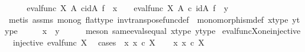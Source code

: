 \begin{isabellebody}
\ \ \isamarkupfalse%
\ \isamarkupfalse%
\ {\isachardoublequoteopen}eval{\isacharunderscore}{\kern0pt}func\ X\ A\ {\isasymcirc}\isactrlsub c{\isacharparenleft}{\kern0pt}id{\isacharparenleft}{\kern0pt}A{\isacharparenright}{\kern0pt}\ {\isasymtimes}\isactrlsub f\ \ x{\isacharparenright}{\kern0pt}\ {\isacharequal}{\kern0pt}\ \ \ eval{\isacharunderscore}{\kern0pt}func\ X\ A\ {\isasymcirc}\isactrlsub c\ {\isacharparenleft}{\kern0pt}id{\isacharparenleft}{\kern0pt}A{\isacharparenright}{\kern0pt}\ {\isasymtimes}\isactrlsub f\ \ y{\isacharparenright}{\kern0pt}{\isachardoublequoteclose}\ \ \isanewline
\ \ \ \ \isamarkupfalse%
\ {\isacharparenleft}{\kern0pt}metis\ assms{\isacharparenleft}{\kern0pt}{}{\isacharparenright}{\kern0pt}\ mono{\isacharunderscore}{\kern0pt}g\ flat{\isacharunderscore}{\kern0pt}type\ inv{\isacharunderscore}{\kern0pt}transpose{\isacharunderscore}{\kern0pt}func{\isacharunderscore}{\kern0pt}def{}\ \ monomorphism{\isacharunderscore}{\kern0pt}def{}\ x{\isacharunderscore}{\kern0pt}type{\isacharprime}{\kern0pt}\ y{\isacharunderscore}{\kern0pt}type{\isacharprime}{\kern0pt}{\isacharparenright}{\kern0pt}\isanewline
\ \ \isamarkupfalse%
\ \isamarkupfalse%
\ {\isachardoublequoteopen}x\ {\isacharequal}{\kern0pt}\ y{\isachardoublequoteclose}\isanewline
\ \ \ \ \isamarkupfalse%
\ {\isacharparenleft}{\kern0pt}meson\ same{\isacharunderscore}{\kern0pt}evals{\isacharunderscore}{\kern0pt}equal\ x{\isacharunderscore}{\kern0pt}type{\isacharprime}{\kern0pt}\ y{\isacharunderscore}{\kern0pt}type{\isacharprime}{\kern0pt}{\isacharparenright}{\kern0pt}\isanewline
{}\isamarkupfalse%
%
\endisatagproof
{\isafoldproof}%
%
\isadelimproof
\isanewline
%
\endisadelimproof
\isanewline
{}\isamarkupfalse%
\ eval{\isacharunderscore}{\kern0pt}func{\isacharunderscore}{\kern0pt}X{\isacharunderscore}{\kern0pt}one{\isacharunderscore}{\kern0pt}injective{\isacharcolon}{\kern0pt}\isanewline
\ \ {\isachardoublequoteopen}injective\ {\isacharparenleft}{\kern0pt}eval{\isacharunderscore}{\kern0pt}func\ X\ {\isasymone}{\isacharparenright}{\kern0pt}{\isachardoublequoteclose}\isanewline
%
\isadelimproof
%
\endisadelimproof
%
\isatagproof
{}\isamarkupfalse%
\ {\isacharparenleft}{\kern0pt}cases\ {\isachardoublequoteopen}{\isasymexists}\ x{\isachardot}{\kern0pt}\ x\ {\isasymin}\isactrlsub c\ X{\isachardoublequoteclose}{\isacharparenright}{\kern0pt}\isanewline
\ \ \isamarkupfalse%
\ {\isachardoublequoteopen}{\isasymexists}x{\isachardot}{\kern0pt}\ x\ {\isasymin}\isactrlsub c\ X{\isachardoublequoteclose}\isanewline

\end{isabellebody}
